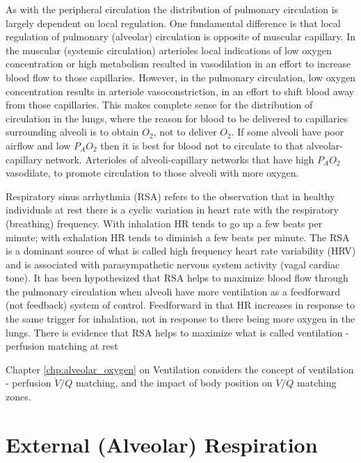As with the peripheral circulation the distribution of pulmonary circulation is largely dependent on local regulation. One fundamental difference is that local regulation of pulmonary (alveolar) circulation is opposite of muscular capillary. In the muscular (systemic circulation) arterioles local indications of low oxygen concentration or high metabolism resulted in vasodilation in an effort to increase blood flow to those capillaries. However, in the pulmonary circulation, low oxygen concentration results in arteriole vasoconstriction, in an effort to shift blood away from those capillaries. This makes complete sense for the distribution of circulation in the lungs, where the reason for blood to be delivered to capillaries surrounding alveoli is to obtain $O_2$, not to deliver $O_2$. If some alveoli have poor airflow and low $P_AO_2$ then it is best for blood not to circulate to that alveolar-capillary network. Arterioles of alveoli-capillary networks that have high $P_AO_2$ vasodilate, to promote circulation to those alveoli with more oxygen.

Respiratory sinus arrhythmia (RSA) refers to the observation that in healthy individuals at rest there is a cyclic variation in heart rate with the respiratory (breathing) frequency. With inhalation HR tends to go up a few beats per minute; with exhalation HR tends to diminish a few beats per minute. The RSA is a dominant source of what is called high frequency heart rate variability (HRV) and is associated with parasympathetic nervous system activity (vagal cardiac tone). It has been hypothesized that RSA helps to maximize blood flow through the pulmonary circulation when alveoli have more ventilation as a feedforward (not feedback) system of control. Feedforward in that HR increases in response to the same trigger for inhalation, not in response to there being more oxygen in the lungs. There is evidence that RSA helps to maximize what is called ventilation - perfusion matching at rest \cite{} %

Chapter \ref{chp:alveolar_oxygen} on Ventilation considers the concept of ventilation - perfusion $\dot{V}/\dot{Q}$ matching, and the impact of body position on $\dot{V}/\dot{Q}$ matching zones.


\section{External (Alveolar) Respiration}



